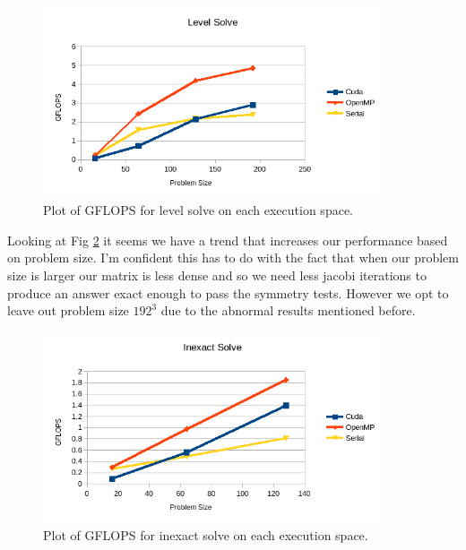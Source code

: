 \documentclass{ccr15}
\begin{document}
\begin{figure}[H]
	\centering
	\includegraphics[width=10cm]{plots/ZAB-LevelSolve.png}
	\caption{Plot of GFLOPS for level solve on each execution space.}
	\label{Level}
\end{figure}

Looking at Fig \ref{Inexact} it seems we have a trend that increases our performance based on
problem size. I'm confident this has to do with the fact that when our problem size is larger our
matrix is less dense and so we need less jacobi iterations to produce an answer exact enough to
pass the symmetry tests. However we opt to leave out problem size $192^3$ due to the abnormal
results mentioned before.

\begin{figure}[H]
	\centering
	\includegraphics[width=10cm]{plots/ZAB-InexactSolve.png}
	\caption{Plot of GFLOPS for inexact solve on each execution space.}
	\label{Inexact}
\end{figure}
\end{document}
